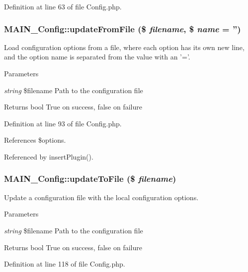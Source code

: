 Definition at line 63 of file Config.php.\hypertarget{classMAIN__Config_a636818348ea40ca509c190c004c89119}{
\subsubsection[{updateFromFile}]{\setlength{\rightskip}{0pt plus 5cm}MAIN\_\-Config::updateFromFile (\$ {\em filename}, \/  \$ {\em name} = {\ttfamily ''})}}
\label{dc/d96/classMAIN__Config_a636818348ea40ca509c190c004c89119}
Load configuration options from a file, where each option has its own new line, and the option name is separated from the value with an '='.


\begin{DoxyParams}{Parameters}
\item[{\em string}]\$filename Path to the configuration file\end{DoxyParams}
\begin{DoxyReturn}{Returns}
bool True on success, false on failure 
\end{DoxyReturn}


Definition at line 93 of file Config.php.

References \$options.

Referenced by insertPlugin().\hypertarget{classMAIN__Config_a9316b105c92355638b38a37d61eb0021}{
\subsubsection[{updateToFile}]{\setlength{\rightskip}{0pt plus 5cm}MAIN\_\-Config::updateToFile (\$ {\em filename})}}
\label{dc/d96/classMAIN__Config_a9316b105c92355638b38a37d61eb0021}
Update a configuration file with the local configuration options.


\begin{DoxyParams}{Parameters}
\item[{\em string}]\$filename Path to the configuration file\end{DoxyParams}
\begin{DoxyReturn}{Returns}
bool True on success, false on failure 
\end{DoxyReturn}


Definition at line 118 of file Config.php.

